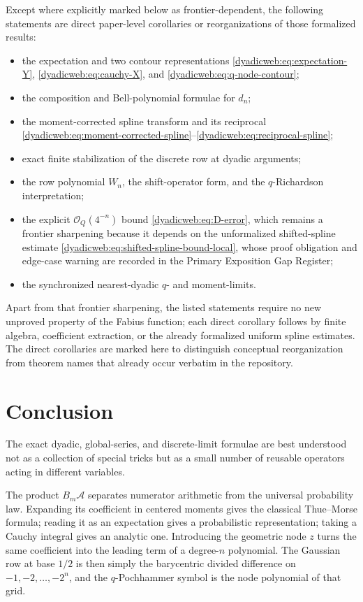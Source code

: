\documentclass[11pt,oneside]{article}
\theoremstyle{definition}
\theoremstyle{remark}
\newcommand{\bigO}{\mathcal O}
\begin{document}
Except where explicitly marked below as frontier-dependent, the following statements are
direct paper-level corollaries or reorganizations of those formalized results:
\begin{itemize}
\item the expectation and two contour representations
      \eqref{dyadicweb:eq:expectation-Y}, \eqref{dyadicweb:eq:cauchy-X}, and \eqref{dyadicweb:eq:q-node-contour};
\item the composition and Bell-polynomial formulae for $d_n$;
\item the moment-corrected spline transform and its reciprocal
      \eqref{dyadicweb:eq:moment-corrected-spline}--\eqref{dyadicweb:eq:reciprocal-spline};
\item exact finite stabilization of the discrete row at dyadic arguments;
\item the row polynomial $W_n$, the shift-operator form, and the $q$-Richardson interpretation;
\item the explicit $\bigO_Q(4^{-n})$ bound \eqref{dyadicweb:eq:D-error}, which remains a
      frontier sharpening because it depends on the unformalized shifted-spline estimate
      \eqref{dyadicweb:eq:shifted-spline-bound-local}, whose proof obligation and edge-case
      warning are recorded in the Primary Exposition Gap Register;
\item the synchronized nearest-dyadic $q$- and moment-limits.
\end{itemize}
Apart from that frontier sharpening, the listed statements require no new unproved property
of the Fabius function; each direct corollary follows by finite algebra, coefficient
extraction, or the already formalized uniform spline estimates.  The direct corollaries are
marked here to distinguish conceptual reorganization from theorem names that already occur
verbatim in the repository.

\section{Conclusion}
\label{dyadicweb:sec:conclusion}

The exact dyadic, global-series, and discrete-limit formulae are best understood not as a
collection of special tricks but as a small number of reusable operators acting in different
variables.

The product $B_m\mathscr A$ separates numerator arithmetic from the universal probability
law.  Expanding its coefficient in centered moments gives the classical Thue--Morse formula;
reading it as an expectation gives a probabilistic representation; taking a Cauchy integral
gives an analytic one.  Introducing the geometric node $z$ turns the same coefficient into
the leading term of a degree-$n$ polynomial.  The Gaussian row at base $1/2$ is then simply
the barycentric divided difference on $-1,-2,\ldots,-2^n$, and the $q$-Pochhammer symbol is the
node polynomial of that grid.
\end{document}
